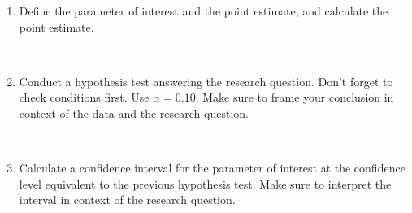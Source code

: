 \documentclass[12pt]{article}
\newcommand{\soln}[2]{$\:$\\ \vspace{#1}}{}
\begin{document}
\begin{enumerate}
\begin{enumerate}
\item Define the parameter of interest and the point estimate, and calculate the point estimate.

\soln{5cm}{}

\item Conduct a hypothesis test answering the research question. Don't forget to check conditions first. Use 
$\alpha = 0.10$. Make sure to frame your conclusion in context of the data and the research question.

\soln{5cm}{}

\item Calculate a confidence interval for the parameter of interest at the confidence level equivalent to the 
previous hypothesis test. Make sure to interpret the interval in context of the research question.

\soln{5cm}{}

\end{enumerate}

\end{enumerate}

\end{document}
